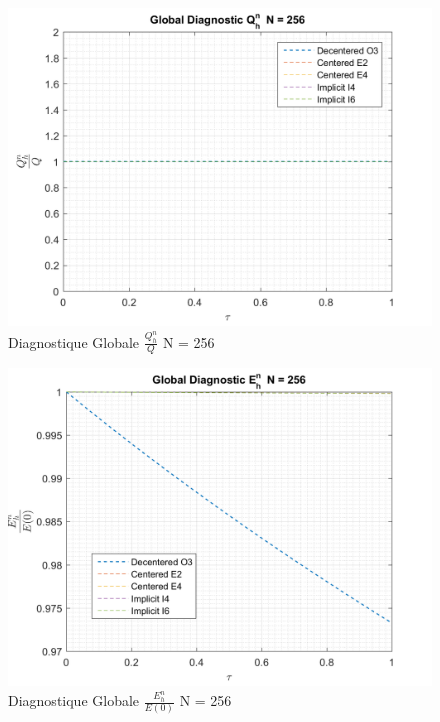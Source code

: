 \documentclass{article}
\begin{document}
\begin{figure}[H]
    \centering
    \includegraphics[scale=0.45]{img/fig6a.png}
    \caption{Diagnostique Globale $\frac{Q_h^n}{Q}$ N = 256 }
    \label{fig6a}
\end{figure}
\begin{figure}[H]
    \centering
    \includegraphics[scale=0.45]{img/fig6b.png}
    \caption{Diagnostique Globale $\frac{E_h^n}{E(0)}$ N = 256 }
    \label{fig6b}
\end{figure}
\end{document}
